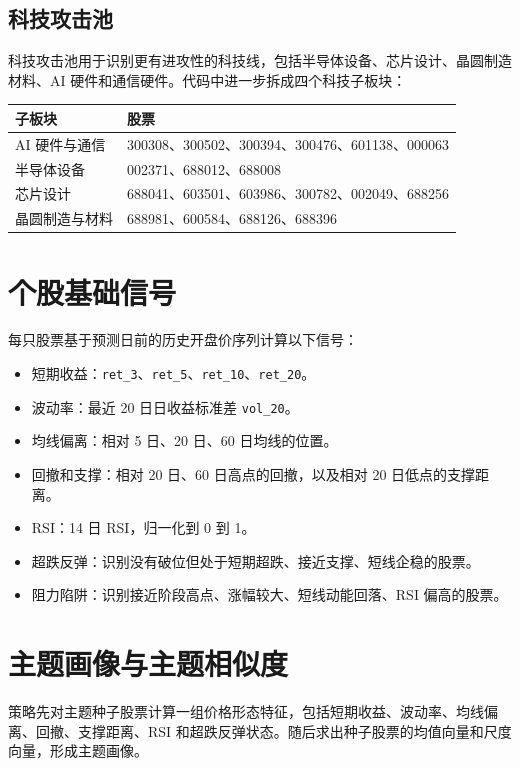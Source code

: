 \documentclass[UTF8,zihao=-4]{ctexart}
\begin{document}
\subsection{科技攻击池}

科技攻击池用于识别更有进攻性的科技线，包括半导体设备、芯片设计、晶圆制造材料、AI 硬件和通信硬件。代码中进一步拆成四个科技子板块：

\begin{longtable}{>{\raggedright\arraybackslash}p{3.5cm} p{10cm}}
\toprule
子板块 & 股票 \\
\midrule
AI 硬件与通信 & 300308、300502、300394、300476、601138、000063 \\
半导体设备 & 002371、688012、688008 \\
芯片设计 & 688041、603501、603986、300782、002049、688256 \\
晶圆制造与材料 & 688981、600584、688126、688396 \\
\bottomrule
\end{longtable}

\section{个股基础信号}

每只股票基于预测日前的历史开盘价序列计算以下信号：

\begin{itemize}
  \item 短期收益：\texttt{ret\_3}、\texttt{ret\_5}、\texttt{ret\_10}、\texttt{ret\_20}。
  \item 波动率：最近 20 日日收益标准差 \texttt{vol\_20}。
  \item 均线偏离：相对 5 日、20 日、60 日均线的位置。
  \item 回撤和支撑：相对 20 日、60 日高点的回撤，以及相对 20 日低点的支撑距离。
  \item RSI：14 日 RSI，归一化到 0 到 1。
  \item 超跌反弹：识别没有破位但处于短期超跌、接近支撑、短线企稳的股票。
  \item 阻力陷阱：识别接近阶段高点、涨幅较大、短线动能回落、RSI 偏高的股票。
\end{itemize}

\section{主题画像与主题相似度}

策略先对主题种子股票计算一组价格形态特征，包括短期收益、波动率、均线偏离、回撤、支撑距离、RSI 和超跌反弹状态。随后求出种子股票的均值向量和尺度向量，形成主题画像。
\end{document}
